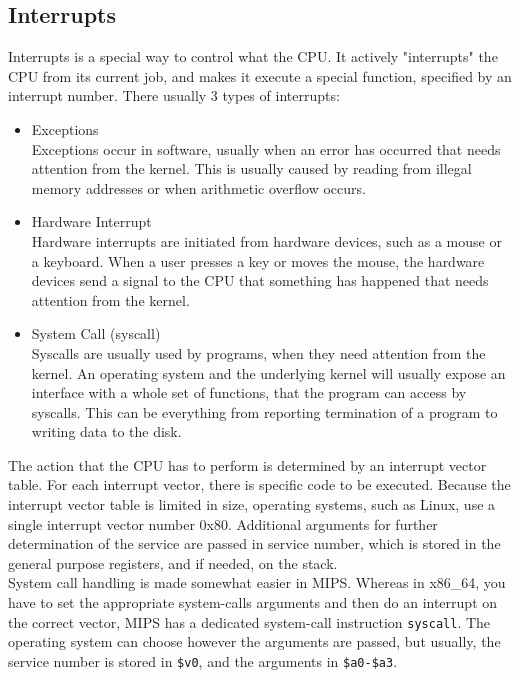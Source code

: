 \subsection{Interrupts}
\label{sec:cpu_architecture_interrupts}
Interrupts is a special way to control what the CPU. It actively "interrupts"
the CPU from its current job, and makes it execute a special function,
specified by an interrupt number. There usually 3 types of interrupts\cite{osdev:interrupts}:
\begin{itemize}
	\item Exceptions\\
	Exceptions occur in software, usually when an error has occurred that
	needs attention from the kernel. This is usually caused by reading from
	illegal memory addresses or when arithmetic overflow occurs.

	\item Hardware Interrupt\\
Hardware interrupts are initiated from hardware devices, such as a
mouse or a keyboard. When a user presses a key or moves the mouse, the hardware
devices send a signal to the CPU that something has happened that needs
attention from the kernel.

	\item System Call (syscall)\\
	Syscalls are usually used by programs, when they need attention from
the kernel. An operating system and the underlying kernel will usually expose
an interface with a whole set of functions, that the program can access by
syscalls. This can be everything from reporting termination of a program to
writing data to the disk.
\end{itemize}

The action that the CPU has to perform is determined by an interrupt vector
table. For each interrupt vector, there is specific code to be executed.
Because the interrupt vector table is limited in size, operating systems, such
as Linux, use a single interrupt vector number 0x80. Additional arguments for
further determination of the service are passed in service number, which is
stored in the general purpose registers, and if needed, on the stack.\\
System call handling is made somewhat easier in MIPS. Whereas in x86\_64, you
have to set the appropriate system-calls arguments and then do an interrupt on
the correct vector, MIPS has a dedicated system-call instruction
\texttt{syscall}. The operating system can choose however the arguments are
passed, but usually, the service number is stored in \texttt{\$v0}, and the
arguments in \texttt{\$a0-\$a3}\cite{COD5}.


